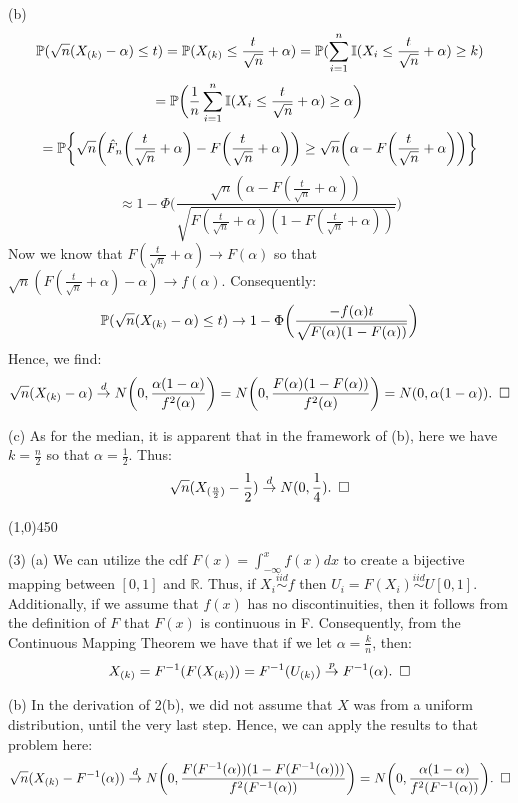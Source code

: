 \documentclass[12pt]{article}
\begin{document}
\noindent
(b) 
$$\mathbb{P}(\sqrt{n}(X_{(k)}-\alpha) \leq t)
= \mathbb{P}(X_{(k)} \leq \frac{t}{\sqrt {n}}+\alpha)
= \mathbb{P}(\sum_{i=1}^n \mathbb{I}(X_i \leq \frac{t}{\sqrt {n}}+\alpha) \geq k)$$
$$= \mathbb{P} \biggl(\frac{1}{n} \sum_{i=1}^n \mathbb{I} (X_i \leq \frac{t}{\sqrt {n}}+\alpha) \geq \alpha \biggr)$$
$$= \mathbb{P} \biggl\{ \sqrt{n} \biggl(\hat{F}_n \biggl(\frac{t}{\sqrt {n}}+\alpha \biggr)-F \biggl(\frac{t}{\sqrt {n}}+\alpha \biggr) \biggr)
\geq \sqrt{n} \biggl(\alpha-F\biggl(\frac{t}{\sqrt {n}}+\alpha \biggr) \biggr) \biggr\}$$
$$\approx 1-\Phi \biggl(\frac{\sqrt{n}(\alpha-F(\frac{t}{\sqrt {n}}+\alpha))}{\sqrt{F(\frac{t}{\sqrt {n}}+\alpha)(1-F(\frac{t}{\sqrt {n}}+\alpha))}}\biggr)$$
Now we know that $F(\frac{t}{\sqrt {n}}+\alpha) 
\to F(\alpha)$ so that $\sqrt{n}(F(\frac{t}{\sqrt {n}}+\alpha)-\alpha) \to f(\alpha)$. Consequently:
$$\mathbb{P}(\sqrt{n}(X_{(k)}-\alpha) \leq t) 
\to 1-\Phi \biggl( \frac{-f(\alpha)t}{\sqrt{F(\alpha)(1-F(\alpha))}} \biggr)$$
Hence, we find:
$$\sqrt{n}(X_{(k)}-\alpha) 
\overset{d}\to N \biggl(0,\frac{\alpha(1-\alpha)}{f^2(\alpha)} \biggr)
= N \biggl(0,\frac{F(\alpha)(1-F(\alpha))}{f^2(\alpha)} \biggr)
= N (0,\alpha(1-\alpha)). \hspace{5 pt} \square$$

\noindent
(c) As for the median, it is apparent that in the framework of (b), here we have $k=\frac{n}{2}$ so that $\alpha = \frac{1}{2}$. Thus:
$$\sqrt{n}(X_{(\frac{n}{2})}-\frac{1}{2}) 
\overset{d}\to N(0,\frac{1}{4}). \hspace{5 pt} \square$$ 

\begin{center}
\line(1,0){450}
\end{center}

\noindent
(3) (a) We can utilize the cdf $F(x) = \int_{-\infty}^x f(x)dx$ to create a bijective mapping between $[0,1]$ and $\mathbb{R}$. Thus, if $X_i \overset{iid}\sim f$ then $U_i = F(X_i) \overset{iid}\sim U[0,1]$. Additionally, if we assume that $f(x)$ has no discontinuities, then it follows from the definition of $F$ that $F(x)$ is continuous in F. Consequently, from the Continuous Mapping Theorem we have that if we let $\alpha = \frac{k}{n}$, then:
$$ X_{(k)} 
= F^{-1}( F(X_{(k)})) 
= F^{-1}(U_{(k)}) 
\overset{p}\to F^{-1}(\alpha).
\hspace{5 pt} \square$$

\noindent
(b) In the derivation of 2(b), we did not assume that $X$ was from a uniform distribution, until the very last step. Hence, we can apply the results to that problem here:
$$\sqrt{n}(X_{(k)}-F^{-1}(\alpha)) 
\overset{d}\to N \biggl(0,\frac{F(F^{-1}(\alpha))(1-F(F^{-1}(\alpha)))}{f^2(F^{-1}(\alpha))} \biggr)
= N \biggl(0,\frac{\alpha(1-\alpha)}{f^2(F^{-1}(\alpha))} \biggr). \hspace{5 pt} \square$$
\end{document}
